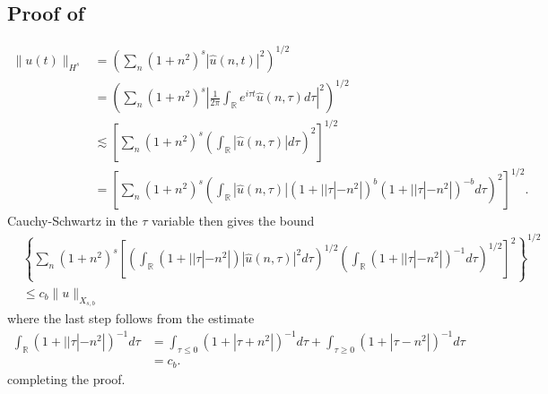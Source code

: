 \documentclass[12pt,reqno]{amsart}
\numberwithin{equation}{section}  %
\renewcommand{\cref}{\Cref}
\newcommand{\rr}{\mathbb{R}}
\newcommand{\wh}{\widehat}
\begin{document}
\begin{appendices}
\subsection{Proof of \cref{lem:embedding}} 
\label{ssec:embedding-pf}
%
%
\begin{equation*}
\begin{split}
  \| u(t) \|_{H^{s}}
  & = \left( \sum_{n} (1 + n^{2})^{s} |
  \wh{u}(n, t) |^{2} \right)^{1/2}
  \\
  & = \left( \sum_{n} (1 + n^{2})^{s} | \frac{1}{2\pi}
  \int_{\rr}e^{i \tau t} \wh{u}(n, \tau) d \tau |^{2} \right)^{1/2}
  \\
  & \lesssim \left[ \sum_{n} (1 + n^{2})^{s} \left( \int_{\rr} |
  \wh{u}(n, \tau)
  | d \tau \right)^{2} \right]^{1/2}
  \\
  & = \left[ \sum_{n} (1 + n^{2})^{s} \left( \int_{\rr} |
  \wh{u}(n, \tau)
  | (1 + | | \tau | - n^{2} |)^{b} (1 + | | \tau | - n^{2} |)^{-b} d \tau
  \right)^{2} \right]^{1/2}.
\end{split}
\end{equation*}
%
%
Cauchy-Schwartz in the $\tau$ variable then gives the bound
%
%
\begin{equation*}
\begin{split}
  & \left \{\sum_{n} (1 + n^{2})^{s} \left[ \left( \int_{\rr} (1 + | |
  \tau | - n^{2}
  |) | \wh{u}(n, \tau) |^{2} d \tau  \right)^{1/2} 
 \left( \int_{\rr} (1 + | |
  \tau | - n^{2}
  |)^{-1}  d \tau  \right)^{1/2}
  \right]^{2}\right \}^{1/2}
  \\
  & \le c_{b} \| u \|_{X_{s,b}}
\end{split}
\end{equation*}
%
where the last step follows from the estimate
%
%
%
%
\begin{equation*}
\begin{split}
\int_{\rr} (1 + | |
  \tau | - n^{2}
  |)^{-1}  d \tau 
  & = \int_{\tau \le 0} (1 + 
  |\tau  + n^{2}
  |)^{-1}  d \tau  + \int_{\tau \ge 0} (1 + | 
  \tau - n^{2}
  |)^{-1}  d \tau
  \\
  & = c_{b}.
\end{split}
\end{equation*}
%
%
completing the proof. \qquad \qedsymbol
%

\end{appendices}
\end{document}
